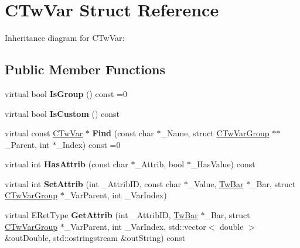 \hypertarget{struct_c_tw_var}{\section{C\+Tw\+Var Struct Reference}
\label{struct_c_tw_var}
}


Inheritance diagram for C\+Tw\+Var\+:
\subsection*{Public Member Functions}
\begin{DoxyCompactItemize}
\item 
\hypertarget{struct_c_tw_var_ac25068e714b7f77b1d85f992030c32d0}{virtual bool {\bfseries Is\+Group} () const =0}\label{struct_c_tw_var_ac25068e714b7f77b1d85f992030c32d0}

\item 
\hypertarget{struct_c_tw_var_a4fbcc414069de1b6d0d07d550d6205fa}{virtual bool {\bfseries Is\+Custom} () const }\label{struct_c_tw_var_a4fbcc414069de1b6d0d07d550d6205fa}

\item 
\hypertarget{struct_c_tw_var_a1b6a2ea33738ab0d87fc1e1c35ab1146}{virtual const \hyperlink{struct_c_tw_var}{C\+Tw\+Var} $\ast$ {\bfseries Find} (const char $\ast$\+\_\+\+Name, struct \hyperlink{struct_c_tw_var_group}{C\+Tw\+Var\+Group} $\ast$$\ast$\+\_\+\+Parent, int $\ast$\+\_\+\+Index) const =0}\label{struct_c_tw_var_a1b6a2ea33738ab0d87fc1e1c35ab1146}

\item 
\hypertarget{struct_c_tw_var_ad05c1e696deedcc289bf79353780aeb9}{virtual int {\bfseries Has\+Attrib} (const char $\ast$\+\_\+\+Attrib, bool $\ast$\+\_\+\+Has\+Value) const }\label{struct_c_tw_var_ad05c1e696deedcc289bf79353780aeb9}

\item 
\hypertarget{struct_c_tw_var_a68a7165aae93b22d0b971dca34441816}{virtual int {\bfseries Set\+Attrib} (int \+\_\+\+Attrib\+I\+D, const char $\ast$\+\_\+\+Value, \hyperlink{struct_c_tw_bar}{Tw\+Bar} $\ast$\+\_\+\+Bar, struct \hyperlink{struct_c_tw_var_group}{C\+Tw\+Var\+Group} $\ast$\+\_\+\+Var\+Parent, int \+\_\+\+Var\+Index)}\label{struct_c_tw_var_a68a7165aae93b22d0b971dca34441816}

\item 
\hypertarget{struct_c_tw_var_a96a3f7e3950407be0638b6b4d77000a1}{virtual E\+Ret\+Type {\bfseries Get\+Attrib} (int \+\_\+\+Attrib\+I\+D, \hyperlink{struct_c_tw_bar}{Tw\+Bar} $\ast$\+\_\+\+Bar, struct \hyperlink{struct_c_tw_var_group}{C\+Tw\+Var\+Group} $\ast$\+\_\+\+Var\+Parent, int \+\_\+\+Var\+Index, std\+::vector$<$ double $>$ \&out\+Double, std\+::ostringstream \&out\+String) const }\label{struct_c_tw_var_a96a3f7e3950407be0638b6b4d77000a1}


\end{DoxyCompactItemize}
